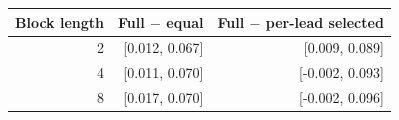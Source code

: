 \begin{tabular}{rrr}
\toprule
Block length & Full $-$ equal & Full $-$ per-lead selected \\
\midrule
2 & [0.012, 0.067] & [0.009, 0.089] \\
4 & [0.011, 0.070] & [-0.002, 0.093] \\
8 & [0.017, 0.070] & [-0.002, 0.096] \\
\bottomrule
\end{tabular}
